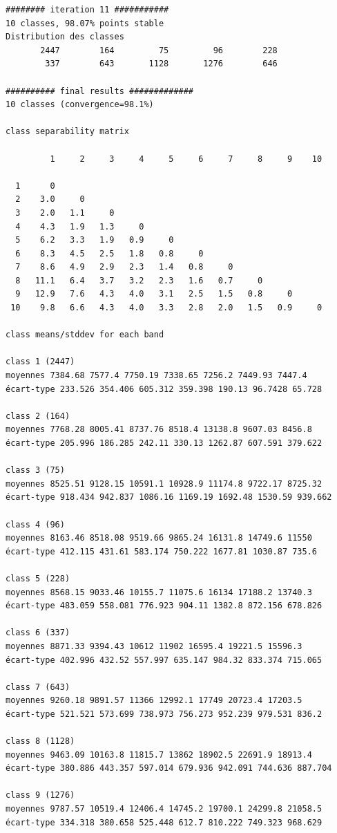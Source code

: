 \documentclass[earth,article,accept,pdftex,moreauthors]{Definitions/mdpi}
\begin{document}
{\begin{scriptsize}
\begin{verbatim}
######## iteration 11 ###########
10 classes, 98.07% points stable
Distribution des classes
       2447        164         75         96        228
        337        643       1128       1276        646

########## final results #############
10 classes (convergence=98.1%)

class separability matrix

         1     2     3     4     5     6     7     8     9    10

  1      0
  2    3.0     0
  3    2.0   1.1     0
  4    4.3   1.9   1.3     0
  5    6.2   3.3   1.9   0.9     0
  6    8.3   4.5   2.5   1.8   0.8     0
  7    8.6   4.9   2.9   2.3   1.4   0.8     0
  8   11.1   6.4   3.7   3.2   2.3   1.6   0.7     0
  9   12.9   7.6   4.3   4.0   3.1   2.5   1.5   0.8     0
 10    9.8   6.6   4.3   4.0   3.3   2.8   2.0   1.5   0.9     0

class means/stddev for each band

class 1 (2447)
moyennes 7384.68 7577.4 7750.19 7338.65 7256.2 7449.93 7447.4
écart-type 233.526 354.406 605.312 359.398 190.13 96.7428 65.728

class 2 (164)
moyennes 7768.28 8005.41 8737.76 8518.4 13138.8 9607.03 8456.8
écart-type 205.996 186.285 242.11 330.13 1262.87 607.591 379.622

class 3 (75)
moyennes 8525.51 9128.15 10591.1 10928.9 11174.8 9722.17 8725.32
écart-type 918.434 942.837 1086.16 1169.19 1692.48 1530.59 939.662

class 4 (96)
moyennes 8163.46 8518.08 9519.66 9865.24 16131.8 14749.6 11550
écart-type 412.115 431.61 583.174 750.222 1677.81 1030.87 735.6

class 5 (228)
moyennes 8568.15 9033.46 10155.7 11075.6 16134 17188.2 13740.3
écart-type 483.059 558.081 776.923 904.11 1382.8 872.156 678.826

class 6 (337)
moyennes 8871.33 9394.43 10612 11902 16595.4 19221.5 15596.3
écart-type 402.996 432.52 557.997 635.147 984.32 833.374 715.065

class 7 (643)
moyennes 9260.18 9891.57 11366 12992.1 17749 20723.4 17203.5
écart-type 521.521 573.699 738.973 756.273 952.239 979.531 836.2

class 8 (1128)
moyennes 9463.09 10163.8 11815.7 13862 18902.5 22691.9 18913.4
écart-type 380.886 443.357 597.014 679.936 942.091 744.636 887.704

class 9 (1276)
moyennes 9787.57 10519.4 12406.4 14745.2 19700.1 24299.8 21058.5
écart-type 334.318 380.658 525.448 612.7 810.222 749.323 968.629


\end{verbatim}
\end{scriptsize}}
\end{document}
